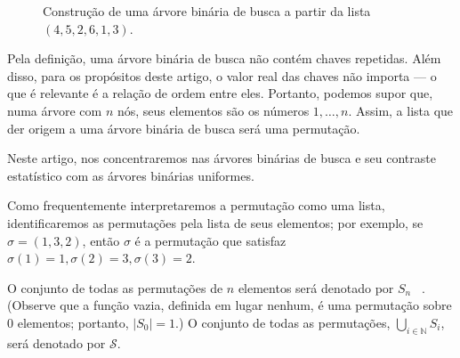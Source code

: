 \begin{figure}[h]
    \centering
    \caption{
        Construção de uma árvore binária de busca a partir da lista $(4, 5, 2, 6, 1, 3)$.
    }
    \label{fig:bst-construction}
\end{figure}

Pela definição,
uma árvore binária de busca não contém chaves repetidas.
Além disso,
para os propósitos deste artigo,
o valor real das chaves não importa
--- o que é relevante é a relação de ordem entre eles.
Portanto,
podemos supor que,
numa árvore com $n$ nós,
seus elementos são os números $1, \dots, n$.
Assim,
a lista que der origem a uma árvore binária de busca
será uma permutação.

Neste artigo,
nos concentraremos nas árvores binárias de busca
e seu contraste estatístico com as árvores binárias uniformes.

\begin{notation}
    Como frequentemente interpretaremos a permutação como uma lista,
    identificaremos as permutações pela lista de seus elementos;
    por exemplo, se $\sigma = (1, 3, 2)$,
    então $\sigma$ é a permutação que satisfaz
    $\sigma(1) = 1, \sigma(2) = 3, \sigma(3) = 2$.

    O conjunto de todas as permutações de $n$ elementos será denotado por $S_n$~%
    \cite[p.~78]{Fraleigh2003}.
    (Observe que a função vazia, definida em lugar nenhum,
    é uma permutação sobre $0$ elementos;
    portanto, $|S_0| = 1$.)
    O conjunto de todas as permutações, $\bigcup_{i \in \mathbb N} S_i$,
    será denotado por $\mathcal S$.
\end{notation}
